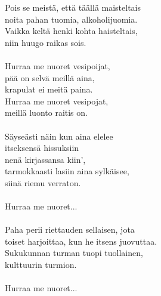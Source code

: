 
Pois se meistä, että täällä maisteltais \\ noita pahan tuomia, alkoholijuomia. \\ Vaikka keltä henki kohta haisteltais, \\ niin huugo raikas sois. \\ \hspace{10mm} \\ Hurraa me nuoret vesipoijat, \\ pää on selvä meillä aina, \\ krapulat ei meitä paina. \\ Hurraa me nuoret vesipojat, \\ meillä luonto raitis on. \\ \hspace{10mm} \\ Säyseästi näin kun aina elelee \\ itseksensä hissuksiin \\ nenä kirjassansa kiin', \\ tarmokkaasti lasiin aina sylkäisee, \\ siinä riemu verraton. \\ \hspace{10mm} \\ Hurraa me nuoret... \\ \hspace{10mm} \\ Paha perii riettauden sellaisen, jota \\ toiset harjoittaa, kun he itsens juovuttaa. \\ Sukukunnan turman tuopi tuollainen, \\ kulttuurin turmion. \\ \hspace{10mm} \\ Hurraa me nuoret...